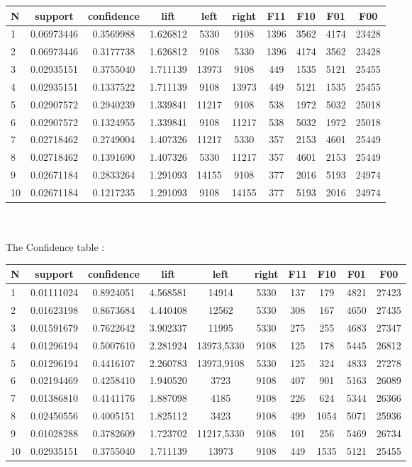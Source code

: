 \documentclass{article}
\begin{document}
\begin{tabular}{|l|*{9}{c|}}
	\hline
N&support&confidence&lift&left&right&F11&F10&F01&F00\\
\hline
1&0.06973446&0.3569988&1.626812&5330&9108&1396&3562&4174&23428\\
\hline
2&0.06973446&0.3177738&1.626812&9108&5330&1396&4174&3562&23428\\
\hline
3&0.02935151&0.3755040&1.711139&13973&9108&449&1535&5121&25455\\
\hline
4&0.02935151&0.1337522&1.711139&9108&13973&449&5121&1535&25455\\
\hline
5&0.02907572&0.2940239&1.339841&11217&9108&538&1972&5032&25018\\
\hline
6&0.02907572&0.1324955&1.339841&9108&11217&538&5032&1972&25018\\
\hline
7&0.02718462&0.2749004&1.407326&11217&5330&357&2153&4601&25449\\
\hline
8&0.02718462&0.1391690&1.407326&5330&11217&357&4601&2153&25449\\
\hline
9&0.02671184&0.2833264&1.291093&14155&9108&377&2016&5193&24974\\
\hline
10&0.02671184&0.1217235&1.291093&9108&14155&377&5193&2016&24974\\
\hline
\end{tabular}\\\\
The Confidence table :\\ 
\begin{tabular}{|l|*{9}{c|}}
	\hline
N&support&confidence&lift&left&right&F11&F10&F01&F00\\
\hline
1&0.01111024&0.8924051&4.568581&14914&5330&137&179&4821&27423\\
\hline
2&0.01623198&0.8673684&4.440408&12562&5330&308&167&4650&27435\\
\hline
3&0.01591679&0.7622642&3.902337&11995&5330&275&255&4683&27347\\
\hline
4&0.01296194&0.5007610&2.281924&13973,5330&9108&125&178&5445&26812\\
\hline
5&0.01296194&0.4416107&2.260783&13973,9108&5330&125&324&4833&27278\\
\hline
6&0.02194469&0.4258410&1.940520&3723&9108&407&901&5163&26089\\
\hline
7&0.01386810&0.4141176&1.887098&4185&9108&226&624&5344&26366\\
\hline
8&0.02450556&0.4005151&1.825112&3423&9108&499&1054&5071&25936\\
\hline
9&0.01028288&0.3782609&1.723702&11217,5330&9108&101&256&5469&26734\\
\hline
10&0.02935151&0.3755040&1.711139&13973&9108&449&1535&5121&25455\\
\hline
\end{tabular}\\ \\ 
\end{document}
